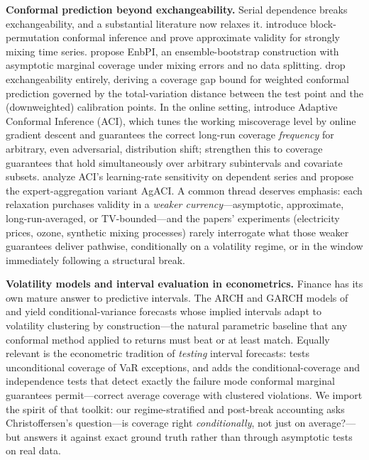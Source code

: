 \documentclass[11pt]{article}
\begin{document}
\textbf{Conformal prediction beyond exchangeability.} Serial dependence breaks
exchangeability, and a substantial literature now relaxes it.
\citet{chernozhukov2018exact} introduce block-permutation conformal inference
and prove approximate validity for strongly mixing time series.
\citet{xu2021conformal} propose EnbPI, an ensemble-bootstrap construction with
asymptotic marginal coverage under mixing errors and no data splitting.
\citet{barber2023conformal} drop exchangeability entirely, deriving a coverage
gap bound for weighted conformal prediction governed by the total-variation
distance between the test point and the (downweighted) calibration points. In
the online setting, \citet{gibbs2021adaptive} introduce Adaptive Conformal
Inference (ACI), which tunes the working miscoverage level by online gradient
descent and guarantees the correct long-run coverage \emph{frequency} for
arbitrary, even adversarial, distribution shift; \citet{gibbs2024conformal}
strengthen this to coverage guarantees that hold simultaneously over arbitrary
subintervals and covariate subsets. \citet{zaffran2022adaptive} analyze ACI's
learning-rate sensitivity on dependent series and propose the
expert-aggregation variant AgACI. A common thread deserves emphasis: each
relaxation purchases validity in a \emph{weaker currency}---asymptotic,
approximate, long-run-averaged, or TV-bounded---and the papers' experiments
(electricity prices, ozone, synthetic mixing processes) rarely interrogate
what those weaker guarantees deliver pathwise, conditionally on a volatility
regime, or in the window immediately following a structural break.

\textbf{Volatility models and interval evaluation in econometrics.} Finance
has its own mature answer to predictive intervals. The ARCH and GARCH models
of \citet{engle1982autoregressive} and \citet{bollerslev1986generalized} yield
conditional-variance forecasts whose implied intervals adapt to volatility
clustering by construction---the natural parametric baseline that any conformal
method applied to returns must beat or at least match. Equally relevant is the
econometric tradition of \emph{testing} interval forecasts:
\citet{kupiec1995techniques} tests unconditional coverage of VaR exceptions,
and \citet{christoffersen1998evaluating} adds the conditional-coverage and
independence tests that detect exactly the failure mode conformal marginal
guarantees permit---correct average coverage with clustered violations. We
import the spirit of that toolkit: our regime-stratified and post-break
accounting asks Christoffersen's question---is coverage right
\emph{conditionally}, not just on average?---but answers it against exact
ground truth rather than through asymptotic tests on real data.
\end{document}
